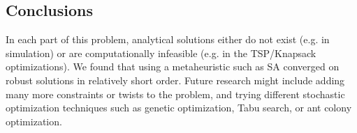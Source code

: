 \documentclass[a0,final]{a0poster}
\begin{document}
\begin{multicols}{3}
\vspace{-15mm}

\section*{Conclusions}

\vspace{-6mm}

In each part of this problem, analytical solutions either do not exist (e.g. in simulation) or are computationally infeasible (e.g. in the TSP/Knapsack optimizations).  We found that using a metaheuristic such as SA converged on robust solutions in relatively short order.  Future research might include adding many more constraints or twists to the problem, and trying different stochastic optimization techniques such as genetic optimization, Tabu search, or ant colony optimization.

\vfill




\end{multicols}
\end{document}

